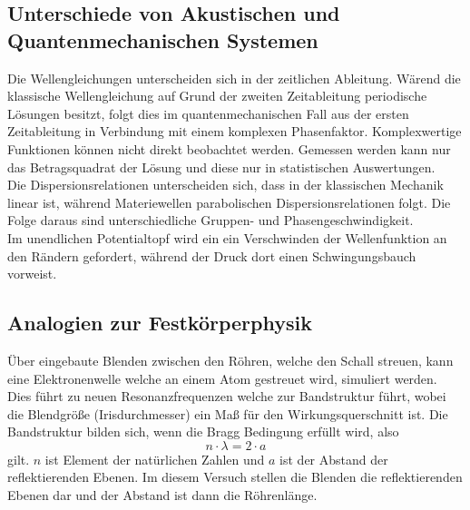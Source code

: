 \subsection{Unterschiede von Akustischen und Quantenmechanischen Systemen}
Die Wellengleichungen unterscheiden sich in der zeitlichen Ableitung.
Wärend die klassische Wellengleichung auf Grund der zweiten Zeitableitung periodische Lösungen besitzt, folgt
dies im quantenmechanischen Fall aus der ersten Zeitableitung in Verbindung mit einem
komplexen Phasenfaktor. Komplexwertige Funktionen können nicht direkt beobachtet werden.
Gemessen werden kann nur das Betragsquadrat der Lösung und diese nur in statistischen
Auswertungen.\\
Die Dispersionsrelationen unterscheiden sich, dass in der klassischen Mechanik linear ist,
während Materiewellen parabolischen Dispersionsrelationen folgt. Die Folge daraus sind
unterschiedliche Gruppen- und Phasengeschwindigkeit.\\
Im unendlichen Potentialtopf wird ein ein Verschwinden der Wellenfunktion an den Rändern
gefordert, während der Druck dort einen Schwingungsbauch vorweist.
\subsection{Analogien zur Festkörperphysik}
Über eingebaute Blenden zwischen den Röhren, welche den Schall streuen, kann eine Elektronenwelle
welche an einem Atom gestreuet wird, simuliert werden. Dies führt zu neuen Resonanzfrequenzen
welche zur Bandstruktur führt, wobei die Blendgröße (Irisdurchmesser) ein Maß für den
Wirkungsquerschnitt ist. Die Bandstruktur bilden sich, wenn die
Bragg Bedingung erfüllt wird, also
\begin{equation}
  n\cdot\lambda=2\cdot a
\end{equation}
gilt. $n$ ist Element der natürlichen Zahlen und $a$ ist der Abstand der reflektierenden Ebenen. Im
diesem Versuch stellen die Blenden die reflektierenden Ebenen dar und der Abstand ist dann die Röhrenlänge.

